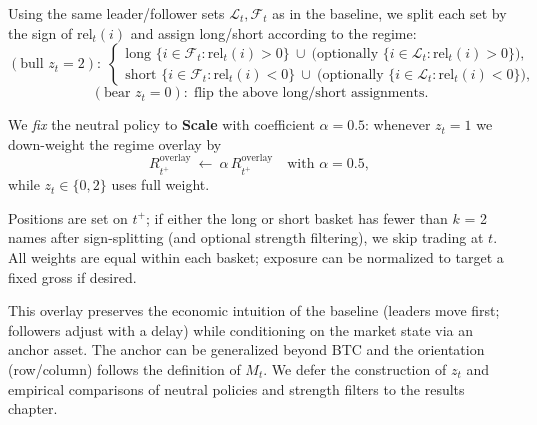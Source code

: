 
Using the same leader/follower sets $\mathcal{L}_t,\mathcal{F}_t$ as in the baseline, we split each set by the sign of $\mathrm{rel}_t(i)$ and assign long/short according to the regime:
\[
(\text{bull } z_t{=}2):\;
\begin{cases}
\text{long }\{i\in\mathcal{F}_t:\mathrm{rel}_t(i)>0\}\ \cup\ \big(\text{optionally }\{i\in\mathcal{L}_t:\mathrm{rel}_t(i)>0\}\big),\\
\text{short }\{i\in\mathcal{F}_t:\mathrm{rel}_t(i)<0\}\ \cup\ \big(\text{optionally }\{i\in\mathcal{L}_t:\mathrm{rel}_t(i)<0\}\big),
\end{cases}
\]
\[
(\text{bear } z_t{=}0):\;\text{flip the above long/short assignments.}
\]



We \emph{fix} the neutral policy to \textbf{Scale} with coefficient $\alpha=\mathbf{0.5}$:
whenever $z_t=1$ we down-weight the regime overlay by
\[
R^{\text{overlay}}_{t^+}\ \gets\ \alpha\,R^{\text{overlay}}_{t^+}\quad\text{with }\alpha=0.5,
\]
while $z_t\in\{0,2\}$ uses full weight. 

Positions are set on $t^+$; if either the long or short basket has fewer than $k$ = 2 names after sign-splitting (and optional strength filtering), we skip trading at $t$.
All weights are equal within each basket; exposure can be normalized to target a fixed gross if desired.

This overlay preserves the economic intuition of the baseline (leaders move first; followers adjust with a delay) while conditioning on the market state via an anchor asset.
The anchor can be generalized beyond BTC and the orientation (row/column) follows the definition of $M_t$.
We defer the construction of $z_t$ and empirical comparisons of neutral policies and strength filters to the results chapter.

